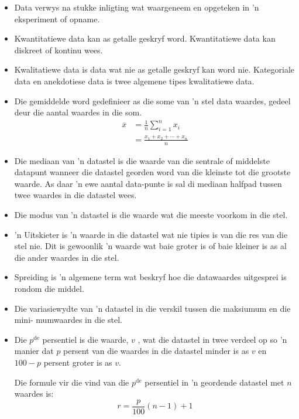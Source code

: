 \begin{itemize}[itemsep=6pt]
\item Data verwys na stukke inligting wat waargeneem en opgeteken in ’n eksperiment of
opname. 

\item Kwantitatiewe data kan as getalle geskryf word. Kwantitatiewe data kan diskreet of kontinu wees.

\item Kwalitatiewe data is data wat nie as getalle geskryf kan word nie. Kategoriale data en anekdotiese data is twee algemene tipes kwalitatiewe data.

\item Die gemiddelde word gedefinieer as die some van ’n stel data waardes, gedeel deur
die aantal waardes in die som. 
  \begin{align*}
    \overline{x} &= \frac{1}{n}\sum_{i=1}^n x_i \\
                 &= \frac{x_1 + x_2 + \cdots + x_n}{n}
  \end{align*}

\item Die mediaan van ’n datastel is die waarde van die sentrale of middelste datapunt
wanneer die datastel georden word van die kleinste tot die grootste waarde. As daar ’n ewe aantal data-punte is sal di mediaan halfpad tussen twee waardes in die datastel wees.
 

\item Die modus van ’n datastel is die waarde wat die meeste voorkom in die stel. 

\item ’n Uitskieter is ’n waarde in die datastel wat nie tipies is van die res van die stel
nie. Dit is gewoonlik ’n waarde wat baie groter is of baie kleiner is as al die ander
waardes in die stel.

\item Spreiding is ’n algemene term wat beskryf hoe die datawaardes uitgesprei is rondom die middel.

\item Die variasiewydte van ’n datastel in die verskil tussen die maksiumum en die mini-
mumwaardes in die stel. 

\item Die $p^{\mathrm{de}}$ persentiel is die waarde, $v$ , wat die datastel in twee verdeel op so ’n manier dat $p$ persent van die waardes in die datastel minder is as $v$ en $100 − p$ persent groter is as $v$.


Die formule vir die vind van die $p^{\mathrm{de}}$ persentiel in ’n geordende datastel met $n$ waardes is:
\begin{equation*}
  r = \frac{p}{100}\left(n-1\right)+1
\end{equation*}


\end{itemize}
